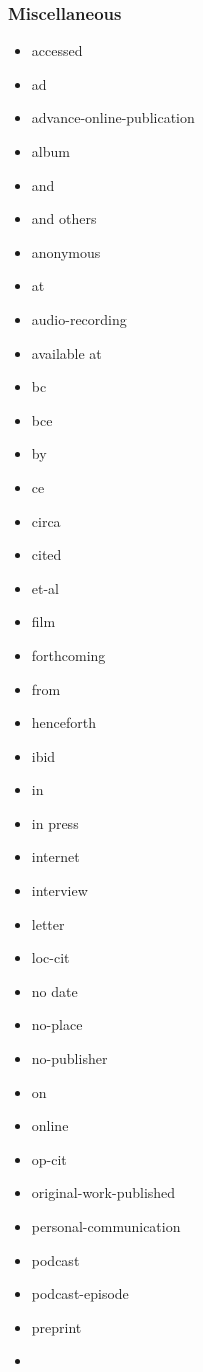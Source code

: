 \hypertarget{miscellaneous}{%
\subsubsection{Miscellaneous}\label{miscellaneous}}

\begin{itemize}
\tightlist
\item
  accessed
\item
  ad
\item
  advance-online-publication
\item
  album
\item
  and
\item
  and others
\item
  anonymous
\item
  at
\item
  audio-recording
\item
  available at
\item
  bc
\item
  bce
\item
  by
\item
  ce
\item
  circa
\item
  cited
\item
  et-al
\item
  film
\item
  forthcoming
\item
  from
\item
  henceforth
\item
  ibid
\item
  in
\item
  in press
\item
  internet
\item
  interview
\item
  letter
\item
  loc-cit
\item
  no date
\item
  no-place
\item
  no-publisher
\item
  on
\item
  online
\item
  op-cit
\item
  original-work-published
\item
  personal-communication
\item
  podcast
\item
  podcast-episode
\item
  preprint
\item

\end{itemize}
